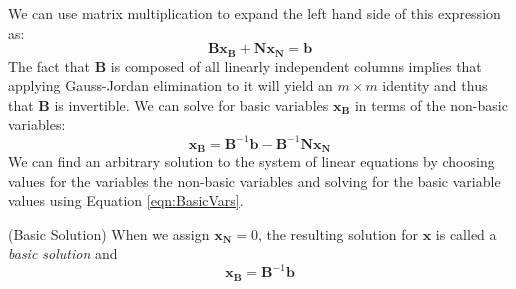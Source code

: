 We can use matrix multiplication to expand the left hand side of this expression as:
\begin{equation}
\mathbf{B}\mathbf{x}_\mathbf{B} + \mathbf{N}\mathbf{x}_\mathbf{N} = \mathbf{b}
\end{equation}
The fact that $\mathbf{B}$ is composed of all linearly independent columns implies that applying Gauss-Jordan elimination to it will yield an $m \times m$ identity and thus that $\mathbf{B}$ is invertible. We can solve for basic variables $\mathbf{x}_\mathbf{B}$ in terms of the non-basic variables:
\begin{equation}
\mathbf{x}_\mathbf{B} = \mathbf{B}^{-1}\mathbf{b} - \mathbf{B}^{-1}\mathbf{N}\mathbf{x}_\mathbf{N}
\label{eqn:BasicVars}
\end{equation}
We can find an arbitrary solution to the system of linear equations by choosing values for the variables the non-basic variables and solving for the basic variable values using Equation \ref{eqn:BasicVars}.
\begin{definition}(Basic Solution)
When we assign $\mathbf{x}_\mathbf{N} = 0$, the resulting solution for $\mathbf{x}$ is called a \textit{basic solution} and 
\begin{equation}
\mathbf{x}_\mathbf{B} = \mathbf{B}^{-1}\mathbf{b}
\end{equation}
\label{def:BasicSoln}
\end{definition}

